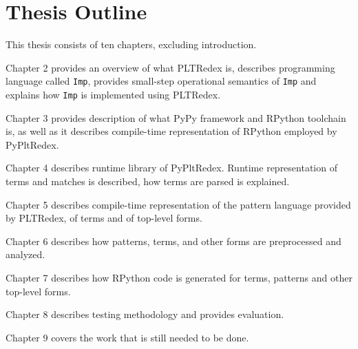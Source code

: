 \section{Thesis Outline}
This thesis consists of ten chapters, excluding introduction.

Chapter 2 provides an overview of what PLTRedex is, describes programming language called \texttt{Imp}, provides small-step operational semantics of \texttt{Imp} and explains how \texttt{Imp} is implemented using PLTRedex.

Chapter 3 provides description of what PyPy framework and RPython toolchain is, as well as it describes compile-time representation of RPython employed by PyPltRedex.

Chapter 4 describes runtime library of PyPltRedex. Runtime representation of terms and matches is described, how terms are parsed is explained.

Chapter 5 describes compile-time representation of the pattern language provided by PLTRedex, of terms and of top-level forms.

Chapter 6 describes how patterns, terms, and other forms are preprocessed and analyzed.

Chapter 7 describes how RPython code is generated for terms, patterns and other top-level forms.

Chapter 8 describes testing methodology and provides evaluation. 

Chapter 9 covers the work that is still needed to be done.

